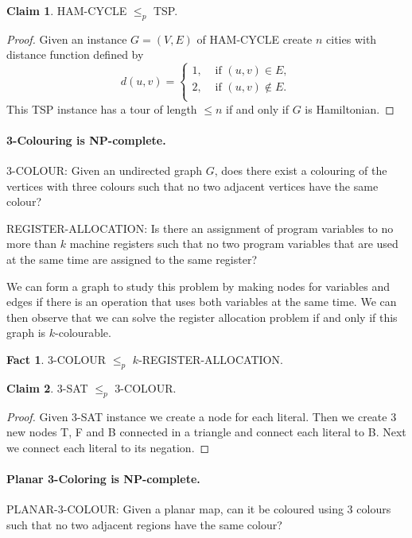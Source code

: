 \documentclass[11pt,a4paper]{article}
\theoremstyle{definition}
\newtheorem{claim}{Claim}
\newtheorem*{fact}{Fact}
\begin{document}
\begin{claim}
HAM-CYCLE $\le_p$ TSP.
\end{claim}
\begin{proof}
Given an instance $G= (V,E)$ of HAM-CYCLE create $n$ cities with distance function defined by
\[
d(u,v) =\begin{cases}
1, &\text{ if } (u,v) \in E,\\
2, &\text{ if } (u,v) \not\in E.\\
\end{cases} 
\]
This TSP instance has a tour of length $\le n$ if and only if $G$ is Hamiltonian.
\end{proof}

\paragraph{3-Colouring is NP-complete.}
3-COLOUR: Given an undirected graph $G$, does there exist a colouring of the vertices with three colours such that no two adjacent vertices have the same colour?

REGISTER-ALLOCATION: Is there an assignment of program variables to no more than $k$ machine registers such that no two program variables that are used at the same time are assigned to the same register?

We can form a graph to study this problem by making nodes for variables and edges if there is an operation that uses both variables at the same time.
We can then observe that we can solve the register allocation problem if and only if this graph is $k$-colourable.

\begin{fact}
3-COLOUR $\le_p$ $k$-REGISTER-ALLOCATION.
\end{fact}

\begin{claim}
3-SAT $\le_p$ 3-COLOUR.
\end{claim}
\begin{proof}
Given 3-SAT instance we create a node for each literal.
Then we create 3 new nodes T, F and B connected in a triangle and connect each literal to B.
Next we connect each literal to its negation.
\end{proof}

\paragraph{Planar 3-Coloring is NP-complete.}
PLANAR-3-COLOUR: Given a planar map, can it be coloured using 3 colours such that no two adjacent regions have the same colour?
\end{document}
